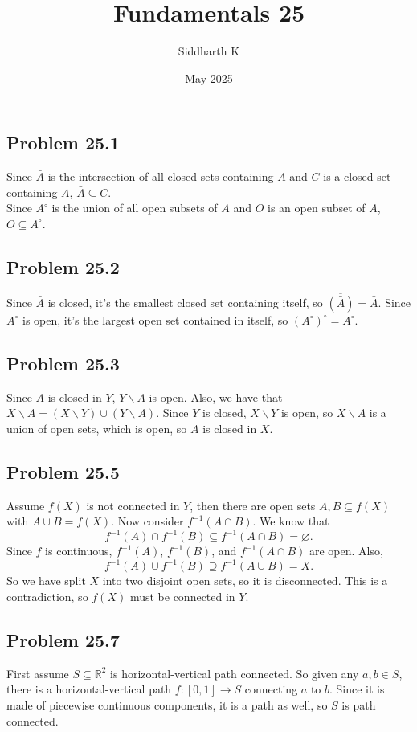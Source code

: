 \documentclass{article}
\title{Fundamentals 25}
\author{Siddharth K}
\date{May 2025}
\newcommand{\R}{\mathbb{R}}
\newcommand{\nullset}{\varnothing}
\newcommand{\minus}{\backslash}
\begin{document}
\maketitle

\subsection*{Problem 25.1}
Since $\bar{A}$ is the intersection of all closed sets containing $A$ and $C$ is a closed set containing $A$, $\bar{A} \subseteq C$. \\

Since $A^\circ$ is the union of all open subsets of $A$ and $O$ is an open subset of $A$, $O \subseteq A^\circ$.

\subsection*{Problem 25.2}
Since $\bar{A}$ is closed, it's the smallest closed set containing itself, so $\overline{(\bar{A})} = \bar{A}$. Since $A^\circ$ is open, it's the largest open set contained in itself, so $(A^\circ)^\circ = A^\circ$.

\subsection*{Problem 25.3}
Since $A$ is closed in $Y$, $Y\minus A$ is open. Also, we have that $X\minus A = (X \minus Y) \cup (Y \minus A)$. Since $Y$ is closed, $X \minus Y$ is open, so $X \minus A$ is a union of open sets, which is open, so $A$ is closed in $X$.

\subsection*{Problem 25.5}
Assume $f(X)$ is not connected in $Y$, then there are open sets $A, B \subseteq f(X)$ with $A \cup B = f(X)$. Now consider $f^{-1}(A \cap B)$. We know that
$$f^{-1}(A) \cap f^{-1}(B) \subseteq f^{-1}(A\cap B) = \nullset.$$
Since $f$ is continuous, $f^{-1}(A)$, $f^{-1}(B)$, and $f^{-1}(A \cap B)$ are open. Also,
$$f^{-1}(A) \cup f^{-1}(B) \supseteq f^{-1}(A \cup B) = X.$$
So we have split $X$ into two disjoint open sets, so it is disconnected. This is a contradiction, so $f(X)$ must be connected in $Y$.

\subsection*{Problem 25.7}
First assume $S \subseteq \R^2$ is horizontal-vertical path connected. So given any $a, b \in S$, there is a horizontal-vertical path $f: [0, 1] \to S$ connecting $a$ to $b$. Since it is made of piecewise continuous components, it is a path as well, so $S$ is path connected. \\
\end{document}
